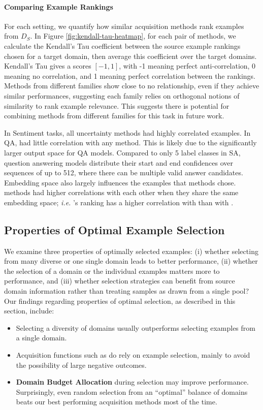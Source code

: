     \respace
    \paragraph{Comparing Example Rankings}
    For each setting, we quantify how similar acquisition methods rank examples from $D_S$.
    In Figure \ref{fig:kendall-tau-heatmap}, for each pair of methods, we calculate the Kendall's Tau coefficient between the source example rankings chosen for a target domain, then average this coefficient over the target domains. 
    Kendall's Tau gives a scores $[-1, 1]$, with -1 meaning perfect anti-correlation, 0 meaning no correlation, and 1 meaning perfect correlation between the rankings.
    Methods from different families show close to no relationship, even if they achieve similar performances, suggesting each family relies on orthogonal notions of similarity to rank example relevance.
    This suggests there is potential for combining methods from different families for this task in future work.
    
    In Sentiment tasks, all uncertainty methods had highly correlated examples.
    In QA, \entr{} had little correlation with any method. 
    This is likely due to the significantly larger output space for QA models.
    Compared to only 5 label classes in SA, question answering models distribute their start and end confidences over sequences of up to 512, where there can be multiple valid answer candidates.
    Embedding space also largely influences the examples that methods chose. 
    \dal{} methods had higher correlations with each other when they share the same embedding space; \emph{i.e.} \dale{}'s ranking has a higher correlation with \dalt{} than with \dales{}.

\respace
\subsection{Properties of Optimal Example Selection}
\label{sec:opt-example-selection}
\respace
    
    We examine three properties of optimally selected examples: (i) whether selecting from many diverse or one single domain leads to better performance, (ii) whether the selection of a domain or the individual examples matters more to performance, and (iii) whether selection strategies can benefit from source domain information rather than treating samples as drawn from a single pool?
    Our findings regarding properties of optimal selection, as described in this section, include:
    \respace
    \begin{itemize}\itemsep0em
        \item Selecting a diversity of domains usually outperforms selecting examples from a single domain. 
        \item Acquisition functions such as \dales{} do rely on example selection, mainly to avoid the possibility of large negative outcomes. 
        \item \textbf{Domain Budget Allocation} during selection may improve performance. Surprisingly, even random selection from an ``optimal'' balance of domains beats our best performing acquisition methods most of the time.  
    \end{itemize}

